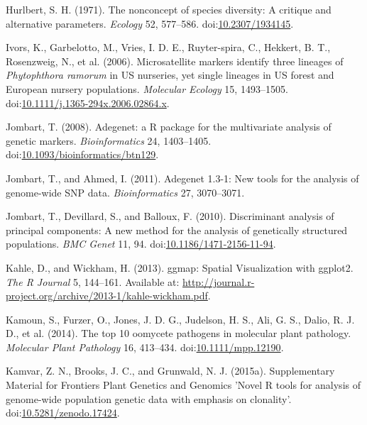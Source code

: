 \documentclass[double,12pt]{beavtex}
\begin{document}
  \hypertarget{ref-hurlbert1971nonconcept}{}
  Hurlbert, S. H. (1971). The nonconcept of species diversity: A critique
  and alternative parameters. \emph{Ecology} 52, 577--586.
  doi:\href{https://doi.org/10.2307/1934145}{10.2307/1934145}.
  
  \hypertarget{ref-ivors2006microsatellite}{}
  Ivors, K., Garbelotto, M., Vries, I. D. E., Ruyter-spira, C., Hekkert,
  B. T., Rosenzweig, N., et al. (2006). Microsatellite markers identify
  three lineages of \emph{Phytophthora ramorum} in US nurseries, yet
  single lineages in US forest and European nursery populations.
  \emph{Molecular Ecology} 15, 1493--1505.
  doi:\href{https://doi.org/10.1111/j.1365-294x.2006.02864.x}{10.1111/j.1365-294x.2006.02864.x}.
  
  \hypertarget{ref-Jombartux5f2008}{}
  Jombart, T. (2008). Adegenet: a R package for the multivariate analysis
  of genetic markers. \emph{Bioinformatics} 24, 1403--1405.
  doi:\href{https://doi.org/10.1093/bioinformatics/btn129}{10.1093/bioinformatics/btn129}.
  
  \hypertarget{ref-jombart2011adegenet}{}
  Jombart, T., and Ahmed, I. (2011). Adegenet 1.3-1: New tools for the
  analysis of genome-wide SNP data. \emph{Bioinformatics} 27, 3070--3071.
  
  \hypertarget{ref-jombart2010discriminant}{}
  Jombart, T., Devillard, S., and Balloux, F. (2010). Discriminant
  analysis of principal components: A new method for the analysis of
  genetically structured populations. \emph{BMC Genet} 11, 94.
  doi:\href{https://doi.org/10.1186/1471-2156-11-94}{10.1186/1471-2156-11-94}.
  
  \hypertarget{ref-khale2013ggmap}{}
  Kahle, D., and Wickham, H. (2013). ggmap: Spatial Visualization with
  ggplot2. \emph{The R Journal} 5, 144--161. Available at:
  \url{http://journal.r-project.org/archive/2013-1/kahle-wickham.pdf}.
  
  \hypertarget{ref-kamoun2014top}{}
  Kamoun, S., Furzer, O., Jones, J. D. G., Judelson, H. S., Ali, G. S.,
  Dalio, R. J. D., et al. (2014). The top 10 oomycete pathogens in
  molecular plant pathology. \emph{Molecular Plant Pathology} 16,
  413--434.
  doi:\href{https://doi.org/10.1111/mpp.12190}{10.1111/mpp.12190}.
  
  \hypertarget{ref-kamvar2015poppr2supp}{}
  Kamvar, Z. N., Brooks, J. C., and Grunwald, N. J. (2015a). Supplementary
  Material for Frontiers Plant Genetics and Genomics 'Novel R tools for
  analysis of genome-wide population genetic data with emphasis on
  clonality'.
  doi:\href{https://doi.org/10.5281/zenodo.17424}{10.5281/zenodo.17424}.
  
\end{document}

